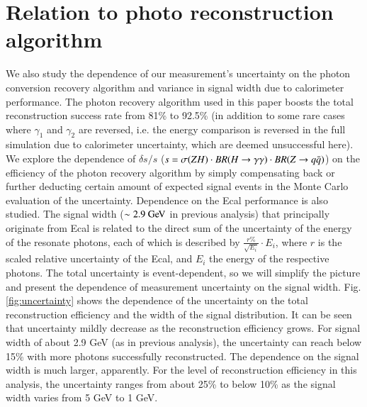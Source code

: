 \documentclass[11pt,a4paper]{cepcnote}
\newcommand{\Zqq}{Z\rightarrow q\bar q}
\newcommand{\PRZH}{\sigma(ZH)}
\newcommand{\qt}{\PRZH\cdot BR(\Hgg)\cdot BR(\Zqq)}
\begin{document}
\section{Relation to photo reconstruction algorithm}
\label{sec:photonrec}
We also study the dependence of our measurement's uncertainty on the photon conversion recovery algorithm and variance in signal width due to calorimeter performance. The photon recovery algorithm used in this paper boosts the total reconstruction success rate from 81\% to 92.5\% (in addition to some rare cases where $\gamma_1$ and $\gamma_2$ are reversed, i.e. the energy comparison is reversed in the full simulation due to calorimeter uncertainty, which are deemed unsuccessful here). We explore the dependence of $\delta s/s$ ($s=\qt$) on the efficiency of the photon recovery algorithm by simply compensating back or further deducting certain amount of expected signal events in the Monte Carlo evaluation of the uncertainty. Dependence on the Ecal performance is also studied. The signal width ($\sim 2.9\GeV$ in previous analysis) that principally originate from Ecal is related to the direct sum of the uncertainty of the energy of the resonate photons, each of which is described by $\frac{r\%}{\sqrt{E_i}}\cdot E_i$, where $r$ is the scaled relative uncertainty of the Ecal, and $E_i$ the energy of the respective photons. The total uncertainty is event-dependent, so we will simplify the picture and present the dependence of measurement uncertainty on the signal width. Fig. \ref{fig:uncertainty} shows the dependence of the uncertainty on the total reconstruction efficiency and the width of the signal distribution. It can be seen that uncertainty mildly decrease as the reconstruction efficiency grows. For signal width of about 2.9 GeV (as in previous analysis), the uncertainty can reach below 15\% with more photons successfully reconstructed. The dependence on the signal width is much larger, apparently. For the level of reconstruction efficiency in this analysis, the uncertainty ranges from about 25\% to below 10\% as the signal width varies from 5 GeV to 1 GeV.
\end{document}
